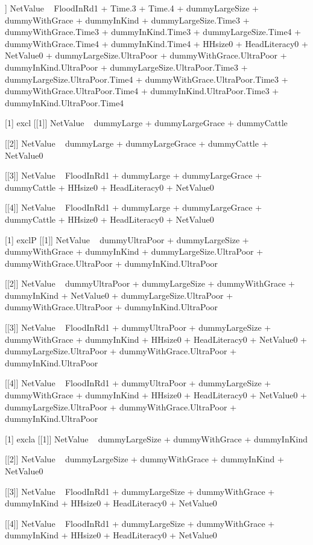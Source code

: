 \begin{Schunk}
\begin{Soutput}
[[4]]
NetValue ~ FloodInRd1 + Time.3 + Time.4 + dummyLargeSize + dummyWithGrace + 
    dummyInKind + dummyLargeSize.Time3 + dummyWithGrace.Time3 + 
    dummyInKind.Time3 + dummyLargeSize.Time4 + dummyWithGrace.Time4 + 
    dummyInKind.Time4 + HHsize0 + HeadLiteracy0 + NetValue0 + 
    dummyLargeSize.UltraPoor + dummyWithGrace.UltraPoor + dummyInKind.UltraPoor + 
    dummyLargeSize.UltraPoor.Time3 + dummyLargeSize.UltraPoor.Time4 + 
    dummyWithGrace.UltraPoor.Time3 + dummyWithGrace.UltraPoor.Time4 + 
    dummyInKind.UltraPoor.Time3 + dummyInKind.UltraPoor.Time4

[1] excl
[[1]]
NetValue ~ dummyLarge + dummyLargeGrace + dummyCattle

[[2]]
NetValue ~ dummyLarge + dummyLargeGrace + dummyCattle + NetValue0

[[3]]
NetValue ~ FloodInRd1 + dummyLarge + dummyLargeGrace + dummyCattle + 
    HHsize0 + HeadLiteracy0 + NetValue0

[[4]]
NetValue ~ FloodInRd1 + dummyLarge + dummyLargeGrace + dummyCattle + 
    HHsize0 + HeadLiteracy0 + NetValue0

[1] exclP
[[1]]
NetValue ~ dummyUltraPoor + dummyLargeSize + dummyWithGrace + 
    dummyInKind + dummyLargeSize.UltraPoor + dummyWithGrace.UltraPoor + 
    dummyInKind.UltraPoor

[[2]]
NetValue ~ dummyUltraPoor + dummyLargeSize + dummyWithGrace + 
    dummyInKind + NetValue0 + dummyLargeSize.UltraPoor + dummyWithGrace.UltraPoor + 
    dummyInKind.UltraPoor

[[3]]
NetValue ~ FloodInRd1 + dummyUltraPoor + dummyLargeSize + dummyWithGrace + 
    dummyInKind + HHsize0 + HeadLiteracy0 + NetValue0 + dummyLargeSize.UltraPoor + 
    dummyWithGrace.UltraPoor + dummyInKind.UltraPoor

[[4]]
NetValue ~ FloodInRd1 + dummyUltraPoor + dummyLargeSize + dummyWithGrace + 
    dummyInKind + HHsize0 + HeadLiteracy0 + NetValue0 + dummyLargeSize.UltraPoor + 
    dummyWithGrace.UltraPoor + dummyInKind.UltraPoor

[1] excla
[[1]]
NetValue ~ dummyLargeSize + dummyWithGrace + dummyInKind

[[2]]
NetValue ~ dummyLargeSize + dummyWithGrace + dummyInKind + NetValue0

[[3]]
NetValue ~ FloodInRd1 + dummyLargeSize + dummyWithGrace + dummyInKind + 
    HHsize0 + HeadLiteracy0 + NetValue0

[[4]]
NetValue ~ FloodInRd1 + dummyLargeSize + dummyWithGrace + dummyInKind + 
    HHsize0 + HeadLiteracy0 + NetValue0


\end{Soutput}
\end{Schunk}
